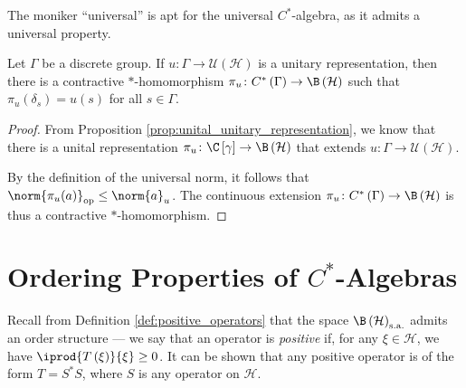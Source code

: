 The moniker ``universal'' is apt for the universal $C^{\ast}$-algebra, as it admits a universal property.
\begin{theorem}
  Let $\Gamma$ be a discrete group. If $u\colon \Gamma\rightarrow \mathcal{U}\left( \mathcal{H} \right)$ is a unitary representation, then there is a contractive $\ast$-homomorphism $\pi_u\colon C^{\ast}\left( \Gamma \right)\rightarrow \B\left( \mathcal{H} \right)$ such that $\pi_u\left( \delta_s \right) = u(s)$ for all $s\in\Gamma$.
  \begin{center}
  \end{center}
\end{theorem}
\begin{proof}
  From Proposition \ref{prop:unital_unitary_representation}, we know that there is a unital representation $\pi_u\colon \C\left[ \gamma \right]\rightarrow \B\left( \mathcal{H} \right)$ that extends $u\colon \Gamma\rightarrow \mathcal{U}\left( \mathcal{H} \right)$.\newline

  By the definition of the universal norm, it follows that $\norm{\pi_u(a)}_{\op}\leq \norm{a}_{u}$. The continuous extension $\pi_u\colon C^{\ast}\left( \Gamma \right)\rightarrow \B\left( \mathcal{H} \right)$ is thus a contractive $\ast$-homomorphism.
\end{proof}
\section{Ordering Properties of \texorpdfstring{$C^{\ast}$-Algebras}{C*-Algebras}}%
Recall from Definition \ref{def:positive_operators} that the space $\B\left( \mathcal{H} \right)_{\sa}$ admits an order structure --- we say that an operator is \textit{positive} if, for any $\xi\in \mathcal{H}$, we have $ \iprod{T\left( \xi \right)}{\xi} \geq 0 $. It can be shown that any positive operator is of the form $T = S^{\ast}S$, where $S$ is any operator on $\mathcal{H}$.\newline

